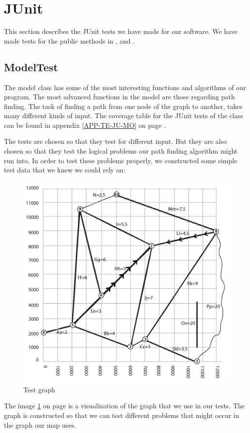 \section{JUnit}
\label{TEST-JU}
This section describes the JUnit tests we have made for our software. We have
made tests for the public methods in ,  and
.

\subsection{ModelTest}
\label{TEST-JU-MT}
The model class has some of the most interesting functions and algorithms of
our program. The most advanced functions in the model are those regarding path
finding. The task of finding a path from one node of the graph to another,
takes many different kinds of input. The coverage table for the JUnit tests of
the  class can be found in appendix \ref{APP-TE-JU-MO} on page
\pageref{APP-TE-JU-MO}.

The tests are chosen so that they test for different input. But they are also
chosen so that they test the logical problems our path finding algorithm might
run into. In order to test these problems properly, we constructed some simple
test data that we knew we could rely on:

\begin{figure}[!ht]
\centering
\includegraphics[width=0.6\linewidth]{images/TestGraph}
\caption{Test graph}
\label{TEST-JU-MT-TG}
\end{figure}

The image \ref{TEST-JU-MT-TG} on page \pageref{TEST-JU-MT-TG} is a visualization
of the graph that we use in our tests. The graph is constructed so that we can
test different problems that might occur in the graph our map uses.

